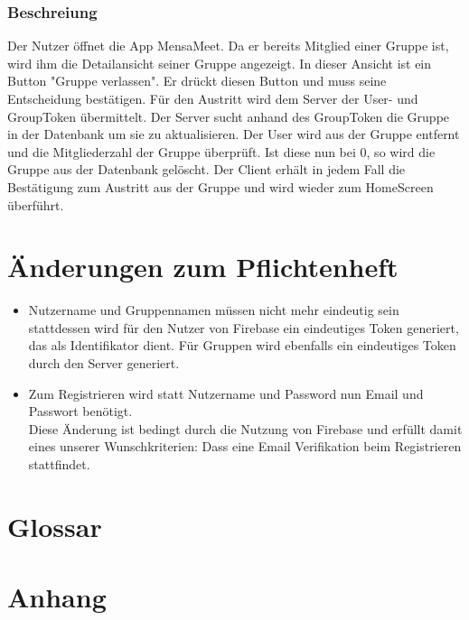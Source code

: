 \documentclass[a4paper]{scrreprt}
\begin{document}
\subsection*{Beschreiung}
Der Nutzer öffnet die App MensaMeet. Da er bereits Mitglied einer Gruppe ist, wird ihm die Detailansicht seiner Gruppe angezeigt.
In dieser Ansicht ist ein Button "Gruppe verlassen". Er drückt diesen Button und muss seine Entscheidung bestätigen. Für den Austritt wird dem Server der User- und GroupToken übermittelt. Der Server sucht anhand des GroupToken die Gruppe in der Datenbank um sie zu aktualisieren. Der User wird aus der Gruppe entfernt und die Mitgliederzahl der Gruppe überprüft. Ist diese nun bei 0, so wird die Gruppe aus der Datenbank gelöscht.
Der Client erhält in jedem Fall die Bestätigung zum Austritt aus der Gruppe und wird wieder zum HomeScreen überführt.


\chapter{Änderungen zum Pflichtenheft}
\begin{itemize}
	\item Nutzername und Gruppennamen müssen nicht mehr eindeutig sein \\
	stattdessen wird für den Nutzer von Firebase ein eindeutiges Token generiert, das als Identifikator dient. Für Gruppen wird ebenfalls ein eindeutiges Token durch den Server generiert.
	\item Zum Registrieren wird statt Nutzername und Password nun Email und Passwort benötigt. \\Diese Änderung ist bedingt durch die Nutzung von Firebase und erfüllt damit eines unserer Wunschkriterien: Dass eine Email Verifikation beim Registrieren stattfindet. 
\end{itemize}

\chapter{Glossar}

\chapter{Anhang}
\end{document}
